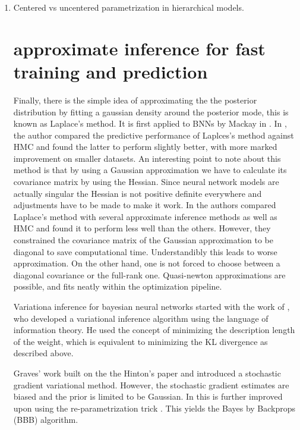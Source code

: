 \documentclass[]{report}
\begin{document}
\begin{enumerate}
\item Centered vs uncentered parametrization in hierarchical models.







\section{approximate inference for fast training and prediction}


Finally, there is the simple idea of approximating the the posterior
distribution by fitting a gaussian density around the posterior mode, this is
known as Laplace's method. It is first applied to BNNs by Mackay in \cite{mackay1992evidence}. In \cite{vivarelli2001comparing}, the author compared the predictive performance of Laplces's method against HMC and found the latter to perform slightly better, with more marked improvement on smaller datasets. An interesting point to note about this method is that by using a Gaussian approximation we have to calculate its covariance matrix by using the Hessian. Since neural network models are actually singular the Hessian is not positive definite everywhere and adjustments have to be made to make it work. In \cite{hernandez2015probabilistic} the authors compared Laplace's method with several approximate inference methods as well as HMC and found it to perform less well than the others. However, they constrained the covariance matrix of the Gaussian approximation to be diagonal to save computational time. Understandibly this leads to worse approximation. On the other hand, one is not forced to choose between a diagonal covariance or the full-rank one. Quasi-newton approximations are possible, and fits neatly within the optimization pipeline.

Variationa inference for bayesian neural networks started with the work of \cite{hinton1993keeping}, who developed a variational inference algorithm using the language of information theory. He used the concept of minimizing the description length of the weight, which is equivalent to minimizing the KL divergence as described above. 

Graves' work \cite{graves2011practical} built on the the Hinton's paper and introduced a stochastic gradient variational method. However, the stochastic gradient estimates are biased and the prior is limited to be Gaussian. In \cite{blundell2015weight} this is further improved upon using the re-parametrization trick \cite{opper2009variational,kingma2013auto,rezende2014stochastic}. This yields the Bayes by Backprops (BBB) algorithm.


\end{enumerate}
\end{document}
